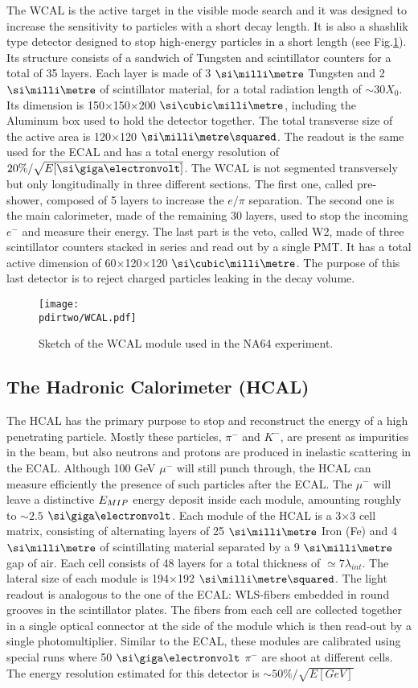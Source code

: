 The WCAL is the active target in the visible mode search and it was designed to increase the sensitivity to particles with a short decay length. It is also a shashlik type detector designed to stop high-energy particles in a short length (see Fig.\ref{fig:wcal-sketch}). Its structure consists of a sandwich of Tungsten and scintillator counters for a total of 35 layers. Each layer is made of 3 $\mmi$ Tungsten and 2 $\mmi$ of scintillator material, for a total radiation length of $\sim$30$X_0$. Its dimension is 150$\times$150$\times$200 $\mmc$, including the Aluminum box used to hold the detector together. The total transverse size of the active area is 120$\times$120 $\mms$. The readout is the same used for the ECAL and has a total energy resolution of $20\%/ \sqrt{E[\gev]}$. The WCAL is not segmented transversely but only longitudinally in three different sections. The first one, called pre-shower, composed of 5 layers to increase the $e/\pi$ separation. The second one is the main calorimeter, made of the remaining 30 layers, used to stop the incoming $e^-$ and measure their energy. The last part is the veto, called W2, made of three scintillator counters stacked in series and read out by a single PMT. It has a total active dimension of 60$\times$120$\times$120 $\mmc$. The purpose of this last detector is to reject charged particles leaking in the decay volume.

\begin{figure}[bth!]
\centering
\texttt{[image: \\pdirtwo/WCAL.pdf]}
\caption[WCAL sketch]{Sketch of the WCAL module used in the NA64 experiment.}
\label{fig:wcal-sketch}
\end{figure}


\subsection{The Hadronic Calorimeter (HCAL)}
\label{ch2:sec:detectors-hcal}

The HCAL has the primary purpose to stop and reconstruct the energy of a high penetrating particle. Mostly these particles, $\pi^-$ and $K^-$, are present as impurities in the beam, but also neutrons and protons are produced in inelastic scattering in the ECAL. Although 100 GeV $\mu^-$ will still punch through, the HCAL can measure efficiently the presence of such particles after the ECAL. The $\mu^-$ will leave a distinctive $E_{MIP}$ energy deposit inside each module, amounting roughly to $\sim 2.5$ $\gev$. Each module of the HCAL is a 3$\times$3 cell matrix, consisting of alternating layers of 25 $\mmi$ Iron (Fe) and 4 $\mmi$ of scintillating material separated by a 9 $\mmi$ gap of air. Each cell consists of 48 layers for a total thickness of $\simeq 7\lambda_{int}$. The lateral size of each module is 194$\times$192 $\mms$. The light readout is analogous to the one of the ECAL: WLS-fibers embedded in round grooves in the scintillator plates. The fibers from each cell are collected together in a single optical connector at the side of the module which is then read-out by a single photomultiplier. Similar to the ECAL, these modules are calibrated using special runs where 50 $\gev$ $\pi^-$ are shoot at different cells. The energy resolution estimated for this detector is $\sim 50\%/\sqrt{E[GeV]}$

